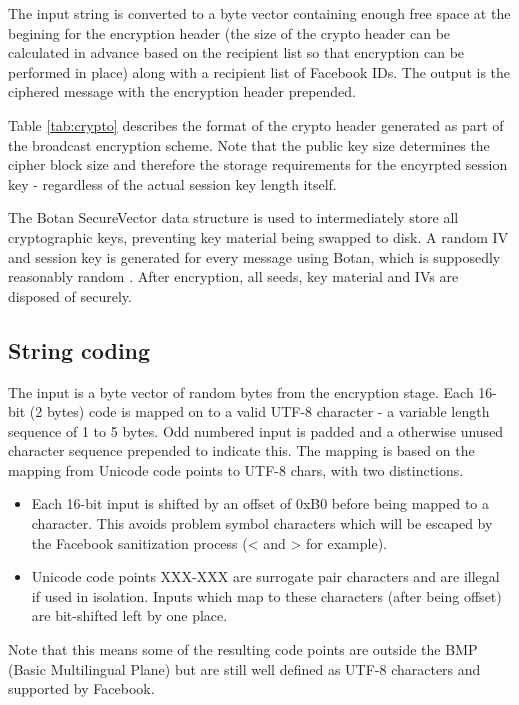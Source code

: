 The input string is converted to a byte vector containing enough free space at the begining for the encryption header (the size of the crypto header can be calculated in advance based on the recipient list so that encryption can be performed in place) along with a recipient list of Facebook IDs. The output is the ciphered message with the encryption header prepended.

Table \ref{tab:crypto} describes the format of the crypto header generated as part of the broadcast encryption scheme. Note that the public key size determines the cipher block size and therefore the storage requirements for the encyrpted session key - regardless of the actual session key length itself.

The Botan SecureVector data structure is used to intermediately store all cryptographic keys, preventing key material being swapped to disk. A random IV and session key is generated for every message using Botan, which is supposedly reasonably random \cite{XXX}. After encryption, all seeds, key material and IVs are disposed of securely.


\FloatBarrier
\subsection{String coding}

The input is a byte vector of random bytes from the encryption stage. Each 16-bit (2 bytes) code is mapped on to a valid UTF-8 character - a variable length sequence of 1 to 5 bytes. Odd numbered input is padded and a otherwise unused character sequence prepended to indicate this. The mapping is based on the mapping from Unicode code points to UTF-8 chars, with two distinctions.

\begin{itemize}

    \item Each 16-bit input is shifted by an offset of 0xB0 before being mapped to a character. This avoids problem symbol characters which will be escaped by the Facebook sanitization process (< and > for example).
    
    \item Unicode code points XXX-XXX are surrogate pair characters and are illegal if used in isolation. Inputs which map to these characters (after being offset) are bit-shifted left by one place.
    
\end{itemize}


Note that this means some of the resulting code points are outside the BMP (Basic Multilingual Plane) but are still well defined as UTF-8 characters and supported by Facebook.

